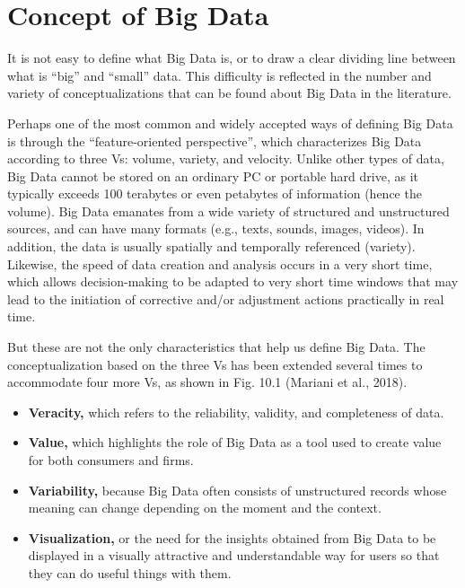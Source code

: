 \documentclass[
  letterpaper,
  DIV=11,
  numbers=noendperiod]{scrreprt}
\begin{document}
\hypertarget{concept-of-big-data}{%
\section{Concept of Big Data}\label{concept-of-big-data}}

It is not easy to define what Big Data is, or to draw a clear dividing
line between what is ``big'' and ``small'' data. This difficulty is
reflected in the number and variety of conceptualizations that can be
found about Big Data in the literature.

Perhaps one of the most common and widely accepted ways of defining Big
Data is through the ``feature-oriented perspective'', which
characterizes Big Data according to three Vs: volume, variety, and
velocity. Unlike other types of data, Big Data cannot be stored on an
ordinary PC or portable hard drive, as it typically exceeds 100
terabytes or even petabytes of information (hence the volume). Big Data
emanates from a wide variety of structured and unstructured sources, and
can have many formats (e.g., texts, sounds, images, videos). In
addition, the data is usually spatially and temporally referenced
(variety). Likewise, the speed of data creation and analysis occurs in a
very short time, which allows decision-making to be adapted to very
short time windows that may lead to the initiation of corrective and/or
adjustment actions practically in real time.

But these are not the only characteristics that help us define Big Data.
The conceptualization based on the three Vs has been extended several
times to accommodate four more Vs, as shown in Fig. 10.1 (Mariani et
al., 2018).

\begin{itemize}
\item
  \textbf{Veracity,} which refers to the reliability, validity, and
  completeness of data.
\item
  \textbf{Value,} which highlights the role of Big Data as a tool used
  to create value for both consumers and firms.
\item
  \textbf{Variability,} because Big Data often consists of unstructured
  records whose meaning can change depending on the moment and the
  context.
\item
  \textbf{Visualization,} or the need for the insights obtained from Big
  Data to be displayed in a visually attractive and understandable way
  for users so that they can do useful things with them.
\end{itemize}
\end{document}
